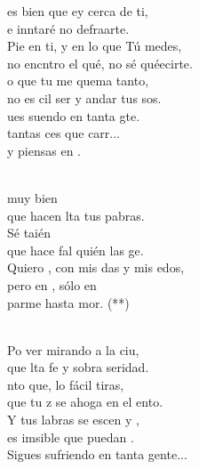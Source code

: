 \documentclass[12pt]{article}
\begin{document}
\begin{multicols*}{2}
\begin{cancion}[Piensas en mí][Nico]%
	es bien que ey cerca de ti,\\
	e inntaré no defraarte.\\
	Pie en ti, y en lo que Tú medes,\\
	no encntro el qué, no sé quéecirte.\\
	o que tu  me quema tanto,\\
	no es cil ser y andar tus sos. \\
	ues suendo en tanta gte. \\
	 tantas ces que carr...\\
	y  piensas en .  \\\jump\\
	\begin{chorus}%
	 muy bien  \\
	que hacen lta tus pabras.\\
	Sé taién \\
	que hace fal quién las ge.\\
	Quiero , con mis das y mis edos,\\
	pero en , sólo en\\
	parme hasta mor. (**)\\
	\end{chorus}%
	\jump\\
	Po ver mirando a la ciu,\\
	que lta fe y sobra seridad.\\
	nto que, lo fácil tiras, \\
	que tu z se ahoga en el ento.\\
	Y tus labras se escen y , \\
	es imsible que puedan .\\
Sigues sufriendo en tanta gente...\\
\end{cancion}%


\end{multicols*}
\end{document}
